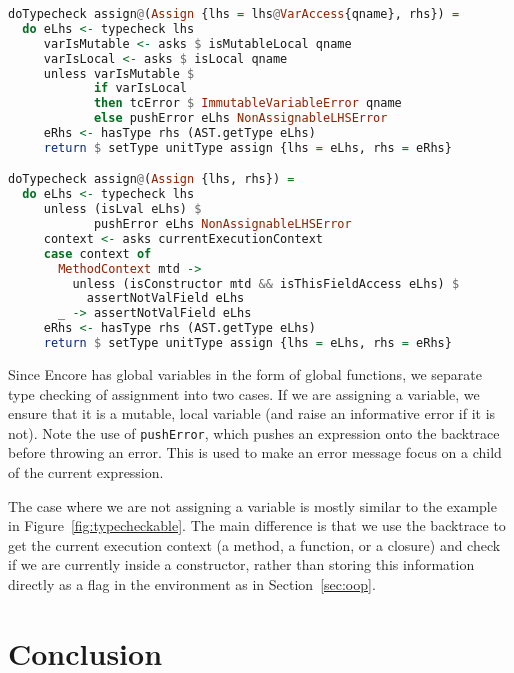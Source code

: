 \documentclass[sigplan,screen]{acmart}
\makeatletter
\newcommand{\ec}[1]{\lstinline[style=encore,breaklines=true,basicstyle=\fontsize{9}{9}\tt]@#1@}
\makeatother
\begin{document}
\begin{lstlisting}[language=Haskell,style=encore]
doTypecheck assign@(Assign {lhs = lhs@VarAccess{qname}, rhs}) =
  do eLhs <- typecheck lhs
     varIsMutable <- asks $ isMutableLocal qname
     varIsLocal <- asks $ isLocal qname
     unless varIsMutable $
            if varIsLocal
            then tcError $ ImmutableVariableError qname
            else pushError eLhs NonAssignableLHSError
     eRhs <- hasType rhs (AST.getType eLhs)
     return $ setType unitType assign {lhs = eLhs, rhs = eRhs}

doTypecheck assign@(Assign {lhs, rhs}) =
  do eLhs <- typecheck lhs
     unless (isLval eLhs) $
            pushError eLhs NonAssignableLHSError
     context <- asks currentExecutionContext
     case context of
       MethodContext mtd ->
         unless (isConstructor mtd && isThisFieldAccess eLhs) $
           assertNotValField eLhs
       _ -> assertNotValField eLhs
     eRhs <- hasType rhs (AST.getType eLhs)
     return $ setType unitType assign {lhs = eLhs, rhs = eRhs}
\end{lstlisting}

Since Encore has global variables in the form of global functions,
we separate type checking of assignment into two cases. If we are
assigning a variable, we ensure that it is a mutable, local
variable (and raise an informative error if it is not). Note the
use of \ec{pushError}, which pushes an expression onto the
backtrace before throwing an error. This is used to make an error
message focus on a child of the current expression.

The case where we are not assigning a variable is mostly similar
to the example in Figure~\ref{fig:typecheckable}. The main
difference is that we use the backtrace to get the current
execution context (a method, a function, or a closure) and check
if we are currently inside a constructor, rather than storing this
information directly as a flag in the environment as in
Section~\ref{sec:oop}.

\section{Conclusion}
\end{document}
